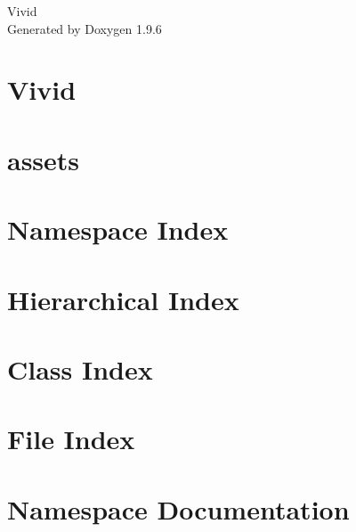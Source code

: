 \documentclass[twoside]{book}
\newcommand{\+}{\discretionary{\mbox{\scriptsize$\hookleftarrow$}}{}{}}
\newcommand{\clearemptydoublepage}{%
    \newpage{\pagestyle{empty}\cleardoublepage}%
  }
\begin{document}
  \raggedbottom
    \hypersetup{pageanchor=false,
                bookmarksnumbered=true,
                pdfencoding=unicode
               }
  \begin{titlepage}
  \vspace*{7cm}
  \begin{center}%
  {\Large Vivid}\\
  \vspace*{1cm}
  {\large Generated by Doxygen 1.9.6}\\
  \end{center}
  \end{titlepage}
  \clearemptydoublepage
  \tableofcontents
  \clearemptydoublepage
  \hypersetup{pageanchor=true}
\chapter{Vivid}
\label{index}\hypertarget{index}{}
\chapter{assets}
\label{md_src_editor_assets_assets}

\chapter{Namespace Index}

\chapter{Hierarchical Index}

\chapter{Class Index}

\chapter{File Index}

\chapter{Namespace Documentation}

\end{document}

